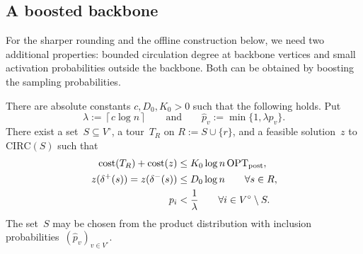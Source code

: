 \documentclass[12pt,a4paper,oneside]{report}
\begin{document}
\subsection{A boosted backbone}
\label{sec:boosted-backbone}

For the sharper rounding and the offline construction below, we need two
additional properties: bounded circulation degree at backbone vertices and
small activation probabilities outside the backbone.  Both can be obtained
by boosting the sampling probabilities.

\begin{proposition}\label{prop:boosted-backbone}
There are absolute constants $c,D_0,K_0>0$ such that the following holds.
Put
\[
    \lambda:=\left\lceil c\log n\right\rceil
    \qquad\text{and}\qquad
    \widehat p_v:=\min\{1,\lambda p_v\}.
\]
There exist a set~$S\subseteq V^\circ$, a tour~$T_R$ on
$R:=S\cup\{r\}$, and a feasible solution~$z$ to
$\mathrm{CIRC}(S)$ such that
\begin{align}
    \operatorname{cost}(T_R)+\operatorname{cost}(z)
    &\le K_0\log n\operatorname{OPT}_\mathrm{post},
    \label{eq:boosted-cost}\\
    z(\delta^+(s))=z(\delta^-(s))
    &\le D_0\log n
    \qquad\forall s\in R,
    \label{eq:boosted-degree}\\
    p_i&<\frac1\lambda
    \qquad\forall i\in V^\circ\setminus S.
    \label{eq:boosted-outside-probability}
\end{align}
The set~$S$ may be chosen from the product distribution with inclusion
probabilities~$(\widehat p_v)_{v\in V^\circ}$.
\end{proposition}
\end{document}
